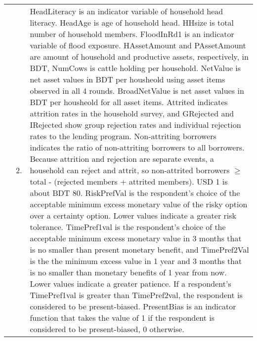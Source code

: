 \begin{table}
\begin{minipage}[t]{14cm}
\begin{tabular}{>{\hfill\scriptsize}p{1cm}<{}>{\hfill\scriptsize}p{.25cm}<{}>{\scriptsize}p{12cm}<{\hfill}}
& 2. & \textsf{HeadLiteracy} is an indicator variable of household head literacy. \textsf{HeadAge} is age of household head. \textsf{HHsize} is total number of household members. \textsf{FloodInRd1} is an indicator variable of flood exposure. \textsf{HAssetAmount} and \textsf{PAssetAmount} are amount of household and productive assets, respectively, in BDT, \textsf{NumCows} is cattle holding per household. \textsf{NetValue} is net asset values in BDT per housheold using asset items observed in all 4 rounds. \textsf{BroadNetValue} is net asset values in BDT per housheold for all asset items. \textsf{Attrited} indicates attrition rates in the household survey, and \textsf{GRejected} and \textsf{IRejected} show group rejection rates and individual rejection rates to the lending program. \textsf{Non-attriting borrowers} indicates the ratio of non-attriting borrowers to all borrowers. Because attrition and rejection are separate events, a household can reject and attrit, so non-attrited borrowers $\geqslant$ total - (rejected members + attrited members). USD 1 is about BDT 80. \textsf{RiskPrefVal} is the respondent's choice of the acceptable minimum excess monetary value of the risky option over a certainty option. Lower values indicate a greater risk tolerance. \textsf{TimePref1val} is the respondent's choice of the acceptable minimum excess monetary value in 3 months that is no smaller than present monetary benefit, and \textsf{TimePref2Val} is the the minimum excess value in 1 year and 3 months that is no smaller than monetary benefits of 1 year from now. Lower values indicate a greater patience. If a respondent's \textsf{TimePref1val} is greater than \textsf{TimePref2val}, the respondent is considered to be present-biased. \textsf{PresentBias} is an indicator function that takes the value of 1 if the respondent is considered to be present-biased, 0 otherwise.%
\end{tabular}
\end{minipage}
\end{table}

